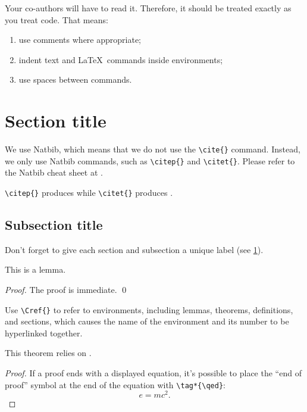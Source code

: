 \documentclass[smallextended]{svjour3}       %
\begin{document}
Your co-authors will have to read it.
Therefore, it should be treated exactly as you treat code.
That means:
\begin{enumerate}
  \item use comments where appropriate;
  \item indent text and \LaTeX\ commands inside environments;
  \item use spaces between commands.
\end{enumerate}

\section{Section title}%
\label{sec:1}

We use Natbib, which means that we do not use the \verb|\cite{}| command.
Instead, we only use Natbib commands, such as \verb|\citep{}| and \verb|\citet{}|.
Please refer to the Natbib cheat sheet at .

\verb|\citep{}| produces \citep{wright-orban-2002} while \verb|\citet{}| produces \citet{wright-orban-2002}.

\subsection{Subsection title}%
\label{sec:2}

Don't forget to give each section and subsection a unique label (see \cref{sec:1}).

\begin{lemma}%
  \label{lem:important}
  This is a lemma.
\end{lemma}

\begin{proof}
  The proof is immediate.
  \qed
\end{proof}

Use \verb|\Cref{}| to refer to environments, including lemmas, theorems, definitions, and sections, which causes the name of the environment and its number to be hyperlinked together.

\begin{theorem}%
  \label{thm:important}
  This theorem relies on .
\end{theorem}

\begin{proof}
  If a proof ends with a displayed equation, it's possible to place the ``end of proof'' symbol at the end of the equation with \verb|\tag*{\qed}|:
  \[
    e = mc^2.
    \tag*{\qed}
  \]
\end{proof}
\end{document}
